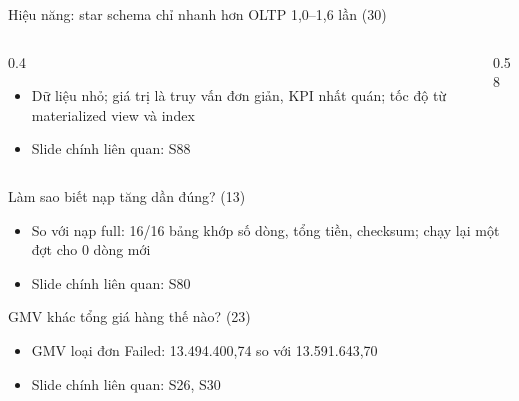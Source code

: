 \begin{frame}{Hiệu năng: star schema chỉ nhanh hơn OLTP 1,0–1,6 lần (30)}
\begin{columns}[T]\begin{column}{0.4\textwidth}
\begin{itemize}
  \item Dữ liệu nhỏ; giá trị là truy vấn đơn giản, KPI nhất quán; tốc độ từ materialized view và index
  \item Slide chính liên quan: S88
\end{itemize}
\end{column}\begin{column}{0.58\textwidth}
\begin{center}\end{center}
\end{column}\end{columns}

\end{frame}

\begin{frame}{Làm sao biết nạp tăng dần đúng? (13)}
\begin{itemize}
  \item So với nạp full: 16/16 bảng khớp số dòng, tổng tiền, checksum; chạy lại một đợt cho 0 dòng mới
  \item Slide chính liên quan: S80
\end{itemize}


\end{frame}

\begin{frame}{GMV khác tổng giá hàng thế nào? (23)}
\begin{itemize}
  \item GMV loại đơn Failed: 13.494.400,74 so với 13.591.643,70
  \item Slide chính liên quan: S26, S30
\end{itemize}


\end{frame}

